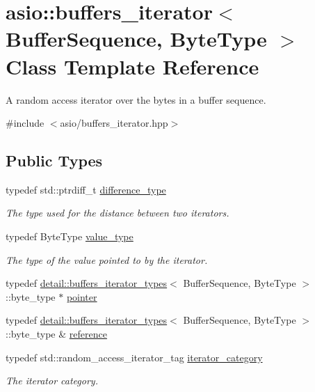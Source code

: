 \hypertarget{classasio_1_1buffers__iterator}{}\section{asio\+:\+:buffers\+\_\+iterator$<$ Buffer\+Sequence, Byte\+Type $>$ Class Template Reference}
\label{classasio_1_1buffers__iterator}


A random access iterator over the bytes in a buffer sequence.  




{\ttfamily \#include $<$asio/buffers\+\_\+iterator.\+hpp$>$}

\subsection*{Public Types}
\begin{DoxyCompactItemize}
\item 
typedef std\+::ptrdiff\+\_\+t \hyperlink{classasio_1_1buffers__iterator_a959fca11c49c2ecb423eb22ccad8062b}{difference\+\_\+type}
\begin{DoxyCompactList}\small\item\em The type used for the distance between two iterators. \end{DoxyCompactList}\item 
typedef Byte\+Type \hyperlink{classasio_1_1buffers__iterator_aa350a7aa5afa6fbf17ecd4f8cc349821}{value\+\_\+type}
\begin{DoxyCompactList}\small\item\em The type of the value pointed to by the iterator. \end{DoxyCompactList}\item 
typedef \hyperlink{structasio_1_1detail_1_1buffers__iterator__types}{detail\+::buffers\+\_\+iterator\+\_\+types}$<$ Buffer\+Sequence, Byte\+Type $>$\+::byte\+\_\+type $\ast$ \hyperlink{classasio_1_1buffers__iterator_a15f732e586b13d7b0d23b5b2ea3b3cb9}{pointer}
\item 
typedef \hyperlink{structasio_1_1detail_1_1buffers__iterator__types}{detail\+::buffers\+\_\+iterator\+\_\+types}$<$ Buffer\+Sequence, Byte\+Type $>$\+::byte\+\_\+type \& \hyperlink{classasio_1_1buffers__iterator_aa57e1b880d781aa295f143cb4f5db61d}{reference}
\item 
typedef std\+::random\+\_\+access\+\_\+iterator\+\_\+tag \hyperlink{classasio_1_1buffers__iterator_a259930bc88ee38a9e9bf9e65aa06dd8c}{iterator\+\_\+category}
\begin{DoxyCompactList}\small\item\em The iterator category. \end{DoxyCompactList}\end{DoxyCompactItemize}
